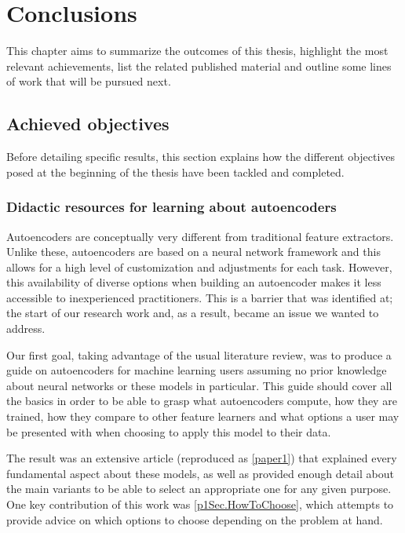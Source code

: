 \setchapterpreamble[u]{\margintoc}
\chapter{Conclusions}
\label{ch:conclusions}

This chapter aims to summarize the outcomes of this thesis, highlight the most relevant achievements, list the related published material and outline some lines of work that will be pursued next.

\section{Achieved objectives}

Before detailing specific results, this section explains how the different objectives posed at the beginning of the thesis have been tackled and completed.

\subsection{Didactic resources for learning about autoencoders}

Autoencoders are conceptually very different from traditional feature extractors. Unlike these, autoencoders are based on a neural network framework and this allows for a high level of customization and adjustments for each task. However, this availability of diverse options when building an autoencoder makes it less accessible to inexperienced practitioners. This is a barrier that was identified at; the start of our research work and, as a result, became an issue we wanted to address.

Our first goal, taking advantage of the usual literature review, was to produce a guide on autoencoders for machine learning users assuming no prior knowledge about neural networks or these models in particular. This guide should cover all the basics in order to be able to grasp what autoencoders compute, how they are trained, how they compare to other feature learners and what options a user may be presented with when choosing to apply this model to their data.

The result was an extensive article (reproduced as \autoref{paper1}) that explained every fundamental aspect about these models, as well as provided enough detail about the main variants to be able to select an appropriate one for any given purpose. One key contribution of this work was \autoref{p1Sec.HowToChoose}, which attempts to provide advice on which options to choose depending on the problem at hand.

